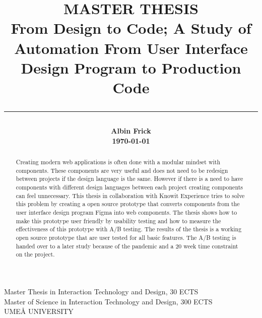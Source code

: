 \title{
    \Large MASTER THESIS\\
    \vspace{5mm}
    \huge \bf
        From Design to Code; A Study of Automation From User Interface Design Program to Production Code\\
        \noindent\rule{\textwidth}{0.4pt}

}

\date{} %
\author{
    \LARGE\bf{Albin Frick}\\
    \today
}

\maketitle
\vspace*{\fill}
\begin{center}
Master Thesis in Interaction Technology and Design, 30 ECTS\\
Master of Science in Interaction Technology and Design, 300 ECTS\\
UMEÅ UNIVERSITY
\end{center}
\newpage
\tableofcontents
\newpage
{}
\begin{abstract}
Creating modern web applications is often done with a modular mindset with components. These components are very useful and does not need to be redesign between projects if the design language is the same. However if there is a need to have components with different design languages between each project creating components can feel unnecessary. This thesis in collaboration with Knowit Experience tries to solve this problem by creating a open source prototype that converts components from the user interface design program Figma into web components. The thesis shows how to make this prototype user friendly by usability testing and how to measure the effectiveness of this prototype with A/B testing. The results of the thesis is a working open source prototype that are user tested for all basic features. The A/B testing is handed over to a later study because of the pandemic and a 20 week time constraint on the project. 
\end{abstract}
\newpage
